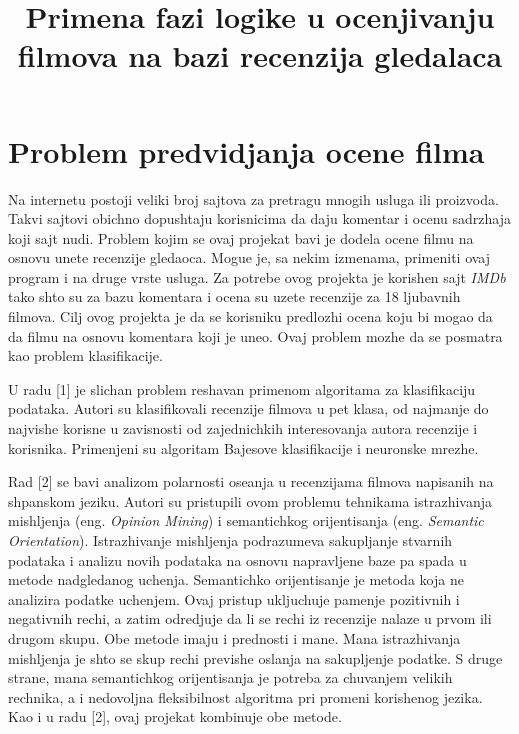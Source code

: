 \documentclass[cyr]{bibl}
\begin{document}
\title{ Primena fazi logike u ocenjivanju filmova na bazi recenzija gledalaca}
\author{{ }}
\address{  Matematichki fakultet\\
}
\author{{ }}
\address{  Matematichki fakultet\\
}

\Large
\maketitle


\newpage
{}
\RaggedRight
\section{Problem predvidjanja ocene filma}
\begin{justify}

Na internetu postoji veliki broj sajtova za pretragu mnogih usluga ili proizvoda. Takvi sajtovi obichno dopushtaju korisnicima da daju komentar i ocenu sadrzhaja koji sajt nudi. Problem kojim se ovaj projekat bavi je dodela ocene filmu na osnovu unete recenzije gledaoca. Mogu\cc e je, sa nekim izmenama, primeniti ovaj program i na druge vrste usluga. Za potrebe ovog projekta je korish\cc en sajt \textit{\Lat IMDb} tako shto su za bazu komentara i ocena su uzete recenzije za 18 ljubavnih filmova. Cilj ovog projekta je da se korisniku predlozhi ocena koju bi mogao da da filmu na osnovu komentara koji je uneo. Ovaj problem mozhe da se posmatra kao problem klasifikacije.

U radu [1] je slichan problem reshavan primenom algoritama za klasifikaciju podataka. Autori su klasifikovali recenzije filmova u pet klasa, od najmanje do najvishe korisne u zavisnosti od zajednichkih interesovanja autora recenzije i korisnika. Primenjeni su algoritam Bajesove klasifikacije i neuronske mrezhe.

Rad [2] se bavi analizom polarnosti ose\cc anja u recenzijama filmova napisanih na shpanskom jeziku. Autori su pristupili ovom problemu tehnikama istrazhivanja mishljenja (eng. \textit{\Lat Opinion Mining}) i semantichkog orijentisanja (eng. \textit{\Lat Semantic Orientation}). Istrazhivanje mishljenja podrazumeva sakupljanje stvarnih podataka i analizu novih podataka na osnovu napravljene baze pa spada u metode nadgledanog uchenja. Semantichko orijentisanje je metoda koja ne analizira podatke uchenjem. Ovaj pristup ukljuchuje pam\cc enje pozitivnih i negativnih rechi, a zatim odredjuje da li se rechi iz recenzije nalaze u prvom ili drugom skupu. Obe metode imaju i prednosti i mane. Mana istrazhivanja mishljenja je shto se skup rechi previshe oslanja na sakupljenje podatke. S druge strane, mana semantichkog orijentisanja je potreba za chuvanjem velikih rechnika, a i nedovoljna fleksibilnost algoritma pri promeni korish\cc enog jezika. Kao i u radu [2], ovaj projekat kombinuje obe metode.  
\end{justify}
\end{document}
